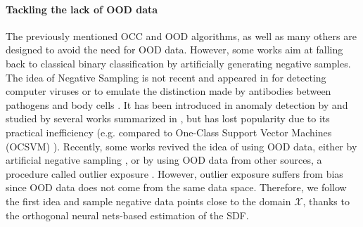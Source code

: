 \paragraph{Tackling the lack of OOD data} The previously mentioned OCC and OOD algorithms, as well as many others \cite{hendrycks_baseline_2018,hsu_generalized_2020-1} are designed to avoid the need for OOD data. However, some works aim at falling back to classical binary classification by artificially generating negative samples. The idea of Negative Sampling is not recent and appeared in \cite{forrest1994self} for detecting computer viruses or to emulate the distinction made by antibodies between pathogens and body cells \cite{gonzalez2002combining}. It has been introduced in anomaly detection by \cite{ayara_negative_2002} and studied by several works summarized in \cite{jinyin2011study}, but has lost popularity due to its practical inefficiency (e.g. compared to One-Class Support Vector Machines (OCSVM) \cite{stibor_is_2005}). Recently, some works revived the idea of using OOD data, either by artificial negative sampling \cite{lee_training_2018-1,sipple_interpretable_2020,goyal_drocc_2020,pourreza_g2d_2021}, or by using OOD data from other sources, a procedure called outlier exposure \cite{fort_exploring_2021,hendrycks_deep_2019}. However, outlier exposure suffers from bias since OOD data does not come from the same data space. Therefore, we follow the first idea and sample negative data points close to the domain $\mathcal{X}$, thanks to the orthogonal neural nets-based estimation of the SDF.




